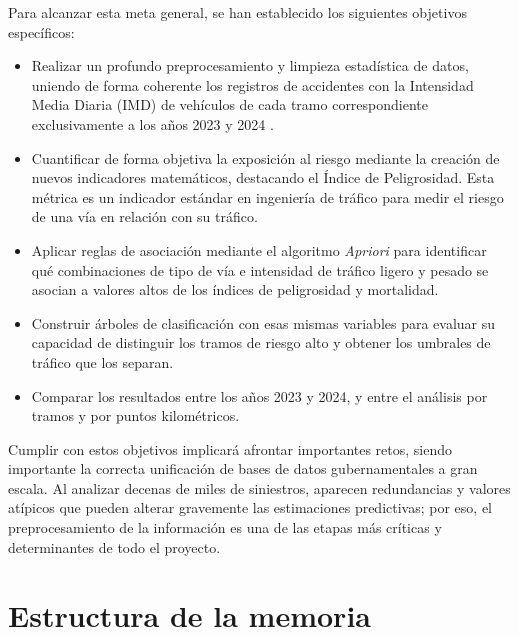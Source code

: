 \documentclass[twoside,a4paper,12pt,onecolumn,openany]{book}
\begin{document}
Para alcanzar esta meta general, se han establecido los siguientes objetivos específicos:

\begin{itemize}
    \item Realizar un profundo preprocesamiento y limpieza estadística de datos, uniendo de forma coherente los registros de accidentes con la Intensidad Media Diaria (IMD) de vehículos de cada tramo correspondiente exclusivamente a los años 2023 y 2024 \cite{mapatraficodgc, anuarioaccidentes}.
   
    \item Cuantificar de forma objetiva la exposición al riesgo mediante la creación de nuevos indicadores matemáticos, destacando el Índice de Peligrosidad. Esta métrica es un indicador estándar en ingeniería de tráfico \cite{ingenieriacarreteras} para medir el riesgo de una vía en relación con su tráfico.

    \item Aplicar reglas de asociación mediante el algoritmo \textit{Apriori} para identificar qué combinaciones de tipo de vía e intensidad de tráfico ligero y pesado se asocian a valores altos de los índices de peligrosidad y mortalidad.

    \item Construir árboles de clasificación con esas mismas variables para evaluar su capacidad de distinguir los tramos de riesgo alto y obtener los umbrales de tráfico que los separan.

    \item Comparar los resultados entre los años 2023 y 2024, y entre el análisis por tramos y por puntos kilométricos.
       
\end{itemize}

\vspace{0.5cm}

Cumplir con estos objetivos implicará afrontar importantes retos, siendo importante la correcta unificación de bases de datos gubernamentales a gran escala. Al analizar decenas de miles de siniestros, aparecen redundancias y valores atípicos que pueden alterar gravemente las estimaciones predictivas; por eso, el preprocesamiento de la información es una de las etapas más críticas y determinantes de todo el proyecto. 

\vspace{0.5cm}
\section{Estructura de la memoria}
\vspace{0.5cm}
\end{document}
